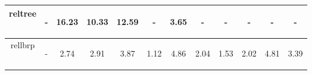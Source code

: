 \documentclass{article}
\begin{document}
\begin{table}[H]
\begin{center}
\begin{tabular}{|c|c|c|c|c|c|c|c|c|c|c|c|}
				    reltree & \begin{footnotesize}-\end{footnotesize} & \begin{footnotesize}16.23\end{footnotesize} & \begin{footnotesize}10.33\end{footnotesize} & \begin{footnotesize}12.59\end{footnotesize} & \begin{footnotesize}-\end{footnotesize} & \begin{footnotesize}3.65\end{footnotesize} & \begin{footnotesize}-\end{footnotesize} & \begin{footnotesize}-\end{footnotesize} & \begin{footnotesize}-\end{footnotesize} & \begin{footnotesize}-\end{footnotesize} & \begin{footnotesize}-\end{footnotesize}\\ \hline
   				    rellbrp & \begin{footnotesize}-\end{footnotesize} & \begin{footnotesize}2.74\end{footnotesize} & \begin{footnotesize}2.91\end{footnotesize} & \begin{footnotesize}3.87\end{footnotesize} & \begin{footnotesize}1.12\end{footnotesize} & \begin{footnotesize}4.86\end{footnotesize} & \begin{footnotesize}2.04\end{footnotesize} & \begin{footnotesize}1.53\end{footnotesize} & \begin{footnotesize}2.02\end{footnotesize} & \begin{footnotesize}4.81\end{footnotesize} & \begin{footnotesize}3.39\end{footnotesize}\\ \hline

\end{tabular}
\end{center}
\end{table}
\end{document}
